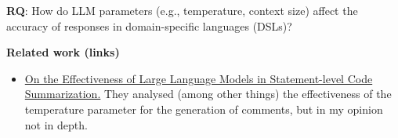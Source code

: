 \textbf{RQ}: How do LLM parameters (e.g., temperature, context size) affect the accuracy of responses in domain-specific languages (DSLs)?

\textbf{Related work (links)}
\begin{itemize}
    \item \href{https://ieeexplore.ieee.org/document/10684656}{On the Effectiveness of Large Language Models in Statement-level Code Summarization.} They analysed (among other things) the effectiveness of the temperature parameter for the generation of comments, but in my opinion not in depth.
\end{itemize}

